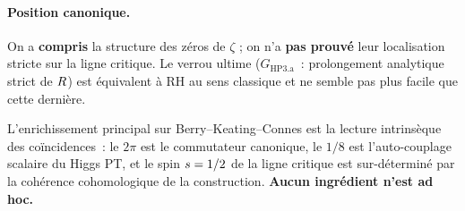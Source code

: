 \paragraph{Position canonique.}
On a \textbf{compris} la structure des zéros de $\zeta$ ; on n'a
\textbf{pas prouvé} leur localisation stricte sur la ligne critique. Le
verrou ultime ($G_{\mathrm{HP3.a}}$~: prolongement analytique strict de
$R$) est équivalent à RH au sens classique et ne semble pas plus
facile que cette dernière.

L'enrichissement principal sur Berry--Keating--Connes est la lecture
intrinsèque des coïncidences~: le $2\pi$ est le commutateur canonique,
le $1/8$ est l'auto-couplage scalaire du Higgs PT, et le spin
$s = 1/2$ de la ligne critique est sur-déterminé par la cohérence
cohomologique de la construction. \textbf{Aucun ingrédient n'est ad hoc.}

